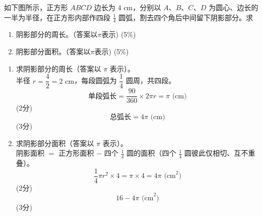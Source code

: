 \documentclass[12pt,a4paper]{exam-zh}
\begin{document}
\newpage
\begin{question}[points = 10]
    如下图所示，正方形 $ABCD$ 边长为 $4\text{ cm}$，分别以 $A$、$B$、$C$、$D$ 为圆心、边长的一半为半径，在正方形内部作四段 $\frac{1}{4}$ 圆弧，割去四个角后中间留下阴影部分。求
\begin{center}

\end{center}

    \begin{enumerate}[label=(\alph*)]
        \item 阴影部分的周长。（答案以$\pi$表示) \hfill (5\%)
        \item 阴影部分面积。（答案以$\pi$表示) \hfill (5\%)
    \end{enumerate}
\end{question}

\begin{solution}
    \begin{enumerate}[label=(\alph*)]
        \item 求阴影部分的周长（答案以 $\pi$ 表示）。 \\
        半径 $r=\dfrac{4}{2}=2\text{ cm}$，每段圆弧为 $\dfrac{1}{4}$ 圆周，共四段。
        \[
            \text{单段弧长} = \frac{90}{360}\times2\pi r = \pi \text{ (cm)}
        \]
        \hfill (2分)
        \[
            \text{总弧长} = 4\pi \text{ (cm)}
        \]
        \hfill (3分)

        \item 求阴影部分面积（答案以 $\pi$ 表示）。 \\
        阴影面积 $=$ 正方形面积 $-$ 四个 $\frac{1}{4}$ 圆的面积（四个 $\frac{1}{4}$ 圆彼此仅相切、互不重叠）。
        \[
            \frac{1}{4}\pi r^2 \times 4 = \pi \times 4 = 4\pi \text{ (cm}^2\text{)}
        \]
        \hfill (2分)
        \[
            16 - 4\pi \text{ (cm}^2\text{)}
        \]
        \hfill (3分)
    \end{enumerate}
\end{solution}
\end{document}
